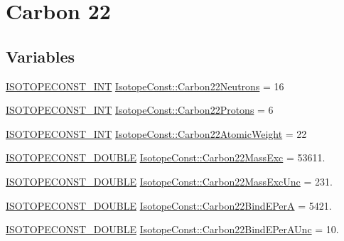 \hypertarget{group___isotope_const-_carbon-_c22}{}\section{Carbon 22}
\label{group___isotope_const-_carbon-_c22}
\subsection*{Variables}
\begin{DoxyCompactItemize}
\item 
\mbox{\hyperlink{group___isotope_const-_macros_ga5f18360b3e99483a35c32d789e62621c}{I\+S\+O\+T\+O\+P\+E\+C\+O\+N\+S\+T\+\_\+\+I\+NT}} \mbox{\hyperlink{group___isotope_const-_carbon-_c22_ga9bb685803c1ebab3ee77b097c5cd4036}{Isotope\+Const\+::\+Carbon22\+Neutrons}} = 16
\item 
\mbox{\hyperlink{group___isotope_const-_macros_ga5f18360b3e99483a35c32d789e62621c}{I\+S\+O\+T\+O\+P\+E\+C\+O\+N\+S\+T\+\_\+\+I\+NT}} \mbox{\hyperlink{group___isotope_const-_carbon-_c22_gada552d06ed8fbff336356e1b24750aa7}{Isotope\+Const\+::\+Carbon22\+Protons}} = 6
\item 
\mbox{\hyperlink{group___isotope_const-_macros_ga5f18360b3e99483a35c32d789e62621c}{I\+S\+O\+T\+O\+P\+E\+C\+O\+N\+S\+T\+\_\+\+I\+NT}} \mbox{\hyperlink{group___isotope_const-_carbon-_c22_ga7fcd52c2908550b86ce482e72c0b2306}{Isotope\+Const\+::\+Carbon22\+Atomic\+Weight}} = 22
\item 
\mbox{\hyperlink{group___isotope_const-_macros_ga8f45a7272ce02c0b4c65c44636ed719a}{I\+S\+O\+T\+O\+P\+E\+C\+O\+N\+S\+T\+\_\+\+D\+O\+U\+B\+LE}} \mbox{\hyperlink{group___isotope_const-_carbon-_c22_ga335608390aeda3954305eed551419990}{Isotope\+Const\+::\+Carbon22\+Mass\+Exc}} = 53611.
\item 
\mbox{\hyperlink{group___isotope_const-_macros_ga8f45a7272ce02c0b4c65c44636ed719a}{I\+S\+O\+T\+O\+P\+E\+C\+O\+N\+S\+T\+\_\+\+D\+O\+U\+B\+LE}} \mbox{\hyperlink{group___isotope_const-_carbon-_c22_ga7f17e494e8488873a9e6f7d9a0dc69be}{Isotope\+Const\+::\+Carbon22\+Mass\+Exc\+Unc}} = 231.
\item 
\mbox{\hyperlink{group___isotope_const-_macros_ga8f45a7272ce02c0b4c65c44636ed719a}{I\+S\+O\+T\+O\+P\+E\+C\+O\+N\+S\+T\+\_\+\+D\+O\+U\+B\+LE}} \mbox{\hyperlink{group___isotope_const-_carbon-_c22_ga1be4b594fc74e4cba18e33b9814d295a}{Isotope\+Const\+::\+Carbon22\+Bind\+E\+PerA}} = 5421.
\item 
\mbox{\hyperlink{group___isotope_const-_macros_ga8f45a7272ce02c0b4c65c44636ed719a}{I\+S\+O\+T\+O\+P\+E\+C\+O\+N\+S\+T\+\_\+\+D\+O\+U\+B\+LE}} \mbox{\hyperlink{group___isotope_const-_carbon-_c22_gaca4e529a77354ee1dd2cfc8e577bfb29}{Isotope\+Const\+::\+Carbon22\+Bind\+E\+Per\+A\+Unc}} = 10.

\end{DoxyCompactItemize}
